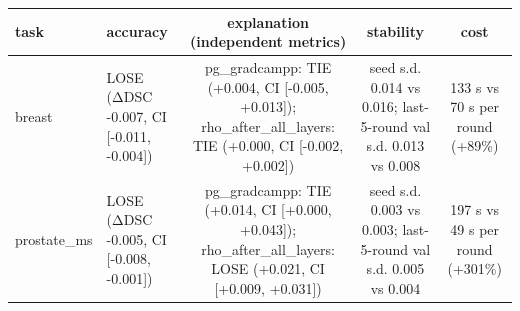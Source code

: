 \begin{tabular}{llccc}
\hline
task & accuracy & explanation (independent metrics) & stability & cost \\
\hline
breast & LOSE (ΔDSC -0.007, CI [-0.011, -0.004]) & pg\_gradcampp: TIE (+0.004, CI [-0.005, +0.013]); rho\_after\_all\_layers: TIE (+0.000, CI [-0.002, +0.002]) & seed s.d. 0.014 vs 0.016; last-5-round val s.d. 0.013 vs 0.008 & 133 s vs 70 s per round (+89\%) \\
prostate\_ms & LOSE (ΔDSC -0.005, CI [-0.008, -0.001]) & pg\_gradcampp: TIE (+0.014, CI [+0.000, +0.043]); rho\_after\_all\_layers: LOSE (+0.021, CI [+0.009, +0.031]) & seed s.d. 0.003 vs 0.003; last-5-round val s.d. 0.005 vs 0.004 & 197 s vs 49 s per round (+301\%) \\
\hline
\end{tabular}

